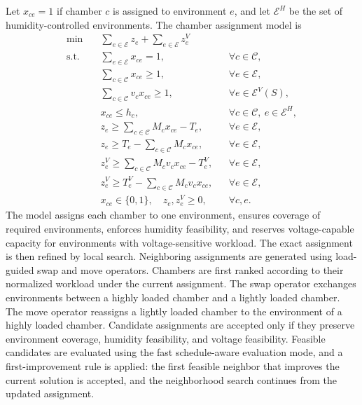 \documentclass[11pt]{article}
\begin{document}
Let \(x_{ce}=1\) if chamber \(c\) is assigned to environment \(e\), and let \(\mathcal{E}^H\) be the set of humidity-controlled environments. The chamber assignment model is
\begin{align}
\min\quad
& \sum_{e\in\mathcal{E}}z_e+\sum_{e\in\mathcal{E}}z_e^V
\\
\text{s.t.}\quad
& \sum_{e\in\mathcal{E}}x_{ce}=1,
&& \forall c\in\mathcal{C},
\\
& \sum_{c\in\mathcal{C}}x_{ce}\ge 1,
&& \forall e\in\mathcal{E},
\\
& \sum_{c\in\mathcal{C}}v_cx_{ce}\ge 1,
&& \forall e\in\mathcal{E}^V(S),
\\
& x_{ce}\le h_c,
&& \forall c\in\mathcal{C},\ e\in\mathcal{E}^H,
\\
& z_e\ge \sum_{c\in\mathcal{C}}M_cx_{ce}-T_e,
&& \forall e\in\mathcal{E},
\\
& z_e\ge T_e-\sum_{c\in\mathcal{C}}M_cx_{ce},
&& \forall e\in\mathcal{E},
\\
& z_e^V\ge \sum_{c\in\mathcal{C}}M_cv_cx_{ce}-T_e^V,
&& \forall e\in\mathcal{E},
\\
& z_e^V\ge T_e^V-\sum_{c\in\mathcal{C}}M_cv_cx_{ce},
&& \forall e\in\mathcal{E},
\\
& x_{ce}\in\{0,1\},\quad z_e,z_e^V\ge 0,
&& \forall c,e.
\end{align}
The model assigns each chamber to one environment, ensures coverage of required environments, enforces humidity feasibility, and reserves voltage-capable capacity for environments with voltage-sensitive workload.
The exact assignment is then refined by local search. Neighboring assignments are generated using load-guided swap and move operators. Chambers are first ranked according to their normalized workload under the current assignment. The swap operator exchanges environments between a highly loaded chamber and a lightly loaded chamber. The move operator reassigns a lightly loaded chamber to the environment of a highly loaded chamber. Candidate assignments are accepted only if they preserve environment coverage, humidity feasibility, and voltage feasibility. Feasible candidates are evaluated using the fast schedule-aware evaluation mode, and a first-improvement rule is applied: the first feasible neighbor that improves the current solution is accepted, and the neighborhood search continues from the updated assignment.
\end{document}

